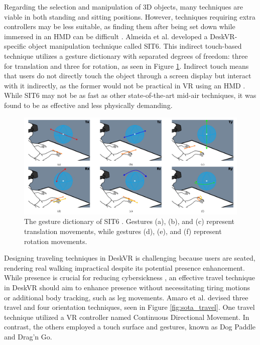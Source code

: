     Regarding the selection and manipulation of 3D objects, many techniques are viable in both standing and sitting positions. However, techniques requiring extra controllers may be less suitable, as finding them after being set down while immersed in an HMD can be difficult \cite{zielaskoRemainSeatedFullyimmersive2017}. Almeida et al. \cite{almeidaSIT6IndirectTouchbased2023} developed a DeskVR-specific object manipulation technique called SIT6. This indirect touch-based technique utilizes a gesture dictionary with separated degrees of freedom: three for translation and three for rotation, as seen in Figure \ref{fig:sota_sit6}.  Indirect touch means that users do not directly touch the object through a screen display but interact with it indirectly, as the former would not be practical in VR using an HMD \cite{mendesSurvey3DVirtual2019}. While SIT6 may not be as fast as other state-of-the-art mid-air techniques, it was found to be as effective and less physically demanding.

    \begin{figure}[h]
        \centering
        \includegraphics[width=1\linewidth]{figures/sit6.png}
        \caption{The gesture dictionary of SIT6 \cite{almeidaSIT6IndirectTouchbased2023}. Gestures (a), (b), and (c) represent translation movements, while gestures (d), (e), and (f) represent rotation movements.}
        \label{fig:sota_sit6}
    \end{figure}

    Designing traveling techniques in DeskVR is challenging because users are seated, rendering real walking impractical despite its potential presence enhancement. While presence is crucial for reducing cybersickness \cite{zielaskoRemainSeatedFullyimmersive2017}, an effective travel technique in DeskVR should aim to enhance presence without necessitating tiring motions or additional body tracking, such as leg movements. Amaro et al. \cite{amaroDesignEvaluationTravel2022} devised three travel and four orientation techniques, seen in Figure \ref{fig:sota_travel}. One travel technique utilized a VR controller named Continuous Directional Movement. In contrast, the others employed a touch surface and gestures, known as Dog Paddle and Drag'n Go.


